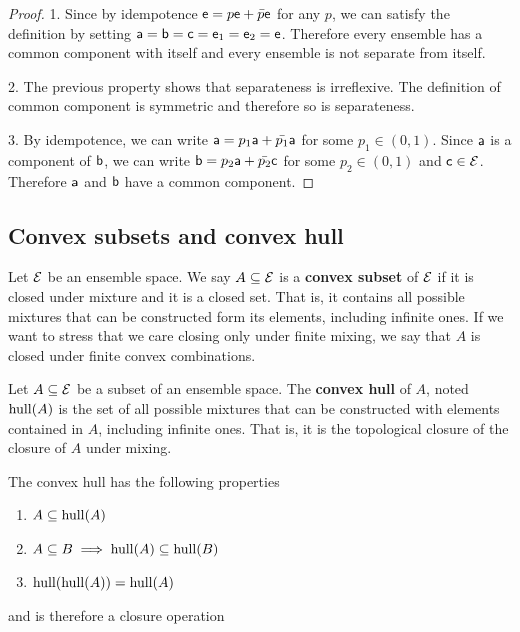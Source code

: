 \begin{proof}
	1. Since by idempotence $\ens = p \ens + \bar{p} \ens$ for any $p$, we can satisfy the definition by setting $\ens[a] = \ens[b] = \ens[c] = \ens_1 = \ens_2 = \ens$. Therefore every ensemble has a common component with itself and every ensemble is not separate from itself.
	
	2. The previous property shows that separateness is irreflexive. The definition of common component is symmetric and therefore so is separateness.
	
	3. By idempotence, we can write $\ens[a] = p_1 \ens[a] + \bar{p_1} \ens[a]$ for some $p_1 \in (0,1)$. Since $\ens[a]$ is a component of $\ens[b]$, we can write $\ens[b] = p_2 \ens[a] + \bar{p_2} \ens[c]$ for some $p_2 \in (0, 1)$ and $\ens[c] \in \Ens$. Therefore $\ens[a]$ and $\ens[b]$ have a common component.
\end{proof}

\subsection{Convex subsets and convex hull}

\begin{defn}
	Let $\Ens$ be an ensemble space. We say $A \subseteq \Ens$ is a \textbf{convex subset} of $\Ens$ if it is closed under mixture and it is a closed set. That is, it contains all possible mixtures that can be constructed form its elements, including infinite ones. If we want to stress that we care closing only under finite mixing, we say that $A$ is closed under finite convex combinations.
\end{defn}

\begin{defn}
	Let $A \subseteq \Ens$ be a subset of an ensemble space. The \textbf{convex hull} of $A$, noted $\hull(A)$ is the set of all possible mixtures that can be constructed with elements contained in $A$, including infinite ones. That is, it is the topological closure of the closure of $A$ under mixing.
\end{defn}

\begin{coro}\label{pm_es_hullProp}
	The convex hull has the following properties
	\begin{enumerate}
		\item $A \subseteq \hull(A)$
		\item $A \subseteq B \implies \hull(A) \subseteq \hull(B)$
		\item $\hull(\hull(A)) = \hull(A)$
	\end{enumerate}
	and is therefore a closure operation
\end{coro}

